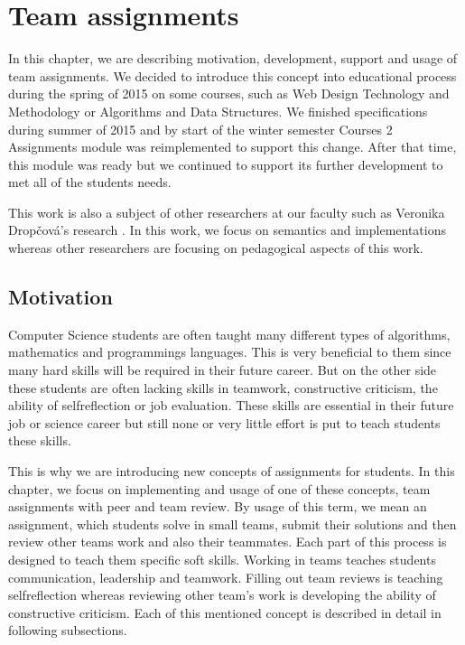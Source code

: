 \chapter{Team assignments}

\label{sec:teamprojects}
In this chapter, we are describing motivation, development, support and usage of team assignments. We decided to introduce this concept into educational process during the spring of 2015 on some courses, such as Web Design Technology and Methodology or Algorithms and Data Structures. We finished specifications during summer of 2015 and by start of the winter semester   Courses 2 Assignments module was reimplemented to support this change. After that time, this module was ready but we continued to support its further development to met all of the students needs.


This work is also a subject of other researchers at our faculty such as Veronika Drop\v{c}ov\'{a}'s research \cite{dropcova}. In this work, we focus on semantics and implementations whereas other researchers are focusing on pedagogical aspects of this work.


\section{Motivation}

Computer Science students are often taught many different types of algorithms, mathematics and programmings languages. This is very beneficial to them since many hard skills will be required in their future career. But on the other side  these students are often lacking skills in teamwork, constructive criticism, the ability of self\-reflection or job evaluation.  These skills are essential in their future job or science career but still none or very little effort is put to teach students these skills. 

This is why we are introducing new concepts of assignments for students.  In this chapter, we focus on implementing and usage of one of these concepts, team assignments with peer and team review. By usage of this term, we mean an assignment, which students solve in small teams, submit their solutions and then review other teams work and also their teammates. Each part of this process is designed to teach them specific soft skills. Working in teams teaches students communication, leadership and teamwork. Filling out team reviews is teaching self\-reflection whereas reviewing other team's work is developing the ability of constructive criticism. Each of this mentioned concept is described in detail in following subsections.

